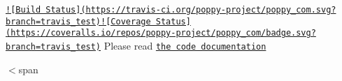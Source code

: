 \href{https://travis-ci.org/poppy-project/poppy_com}{\tt !\mbox{[}Build Status\mbox{]}(https\-://travis-\/ci.\-org/poppy-\/project/poppy\-\_\-com.\-svg?branch=travis\-\_\-test)}\href{https://coveralls.io/github/poppy-project/poppy_com?branch=travis_test}{\tt !\mbox{[}Coverage Status\mbox{]}(https\-://coveralls.\-io/repos/poppy-\/project/poppy\-\_\-com/badge.\-svg?branch=travis\-\_\-test)} Please read \href{http://poppy-project.github.io/poppy_com/}{\tt the code documentation}

$<$span 